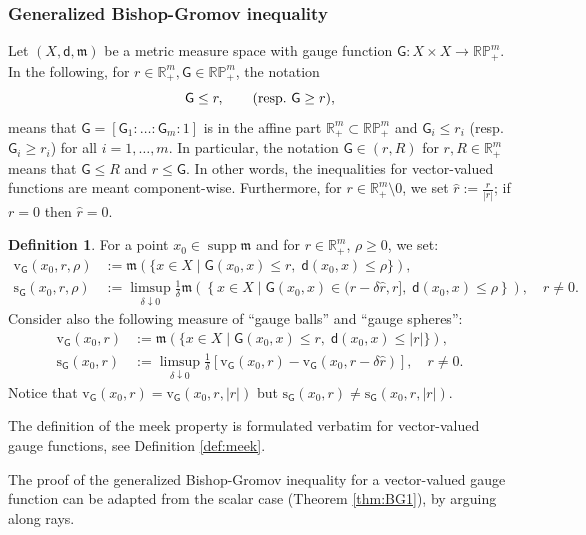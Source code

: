 \documentclass[11pt,a4paper]{article}
\theoremstyle{plain}
\theoremstyle{definition}
\newtheorem{definition}[theorem]{Definition}
\theoremstyle{remark}
\numberwithin{equation}{section}
\newcommand{\R}{\mathbb{R}} %
\newcommand{\RP}{\mathbb{RP}} %
\DeclareMathOperator{\supp}{\mathrm{supp}}
\newcommand{\rv}{\mathrm{v}}
\newcommand{\rs}{\mathrm{s}}
\newcommand{\mm}{\mathfrak m}
\newcommand{\sfd}{\mathsf d}
\newcommand{\sfG}{\mathsf G}
\begin{document}
\subsubsection*{Generalized Bishop-Gromov inequality}

Let $(X,\sfd,\mm)$ be a  metric measure space with gauge function $\sfG:X\times X\to \RP^{m}_+$.  In the following, for $r\in \R^m_+,\sfG\in \RP^m_+$, the notation
\begin{equation}
\sfG \leq r, \qquad \text{(resp.\@ $\sfG\geq r$)},
\end{equation}
means that $\sfG  =[\sfG_1:\dots:\sfG_m:1]$ is in the affine part $\R^m_+ \subset \RP^m_+$ and $\sfG_i \leq r_i$  (resp.\@ $\sfG_i \geq r_i$) for all $i=1,\dots,m$.  In particular, the notation $\sfG \in (r,R)$ for $r,R\in \R^{m}_{+}$ means that $\sfG\leq R$ and $r\leq\sfG$. In other words, the inequalities for vector-valued functions are meant component-wise. Furthermore, for $r\in \R^m_+\setminus 0$, we set $\hat{r} := \tfrac{r}{|r|}$; if $r=0$ then $\hat{r} =0$. 

\begin{definition}\label{def:gaugesetsVec}
For a point $x_{0}\in \supp \mm$ and for $r\in \R^m_+$, $\rho\geq 0$, we set:
\begin{align}
\rv_{\sfG}(x_0,r,\rho)& :=\mm\left(\{x\in X \mid \sfG(x_0,x)\leq r,\;  \sfd(x_0,x)\leq \rho\}\right), \\
\rs_{\sfG}(x_0,r,\rho)& :=\limsup_{\delta\downarrow 0}\frac{1}{\delta} \mm\left(\left\{x\in X \mid \sfG(x_0,x) \in (r-\delta\hat{r}, r],\; \sfd(x_0,x)\leq \rho\right\}\right), \quad r\neq 0.
\end{align}
Consider also the following measure of ``gauge balls'' and ``gauge spheres'':
\begin{align}
\rv_{\sfG}(x_0,r) & :=  \mm\left( \{ x\in X \mid \sfG(x_0,x)\leq r,\; \sfd(x_0,x)\leq |r|\}\right), \label{eq:defvGrVec} \\
\rs_{\sfG}(x_0,r) & := \limsup_{\delta\downarrow 0}\frac{1}{\delta}\left[\rv_{\sfG}(x_0,r)-\rv_{\sfG}(x_0,r-\delta \hat{r})\right], \quad r\neq 0. \label{eq:defsGrVec}
\end{align}
Notice that $\rv_{\sfG}(x_0,r) = \rv_{\sfG}(x_0,r,|r|)$ but $\rs_{\sfG}(x_0,r) \neq \rs_{\sfG}(x_0,r,|r|)$.
\end{definition}

The definition of the meek property is formulated verbatim for vector-valued gauge functions, see Definition \ref{def:meek}.


The proof of the generalized Bishop-Gromov inequality for a vector-valued gauge function can be adapted from the scalar case (Theorem \ref{thm:BG1}), by arguing along rays.
\end{document}
